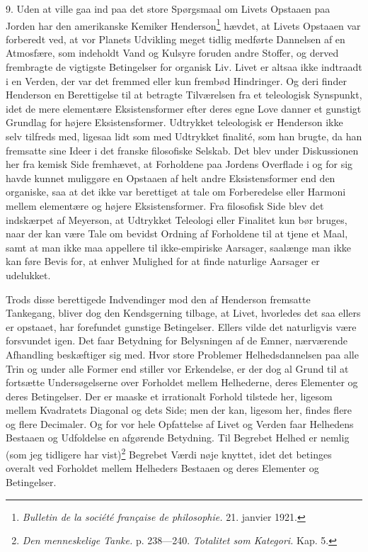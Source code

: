 \documentclass[12pt]{article}
\newcommand{\opage}[1]{\marginnote{\footnotesize\textit{[#1]}}}
\begin{document}
9. Uden at ville gaa ind paa det store Spørgsmaal om Livets Opstaaen
paa Jorden har den amerikanske Kemiker Henderson\footnote{\textit{Bulletin
de la société française de philosophie.} 21. janvier 1921.} hævdet, at
Livets Opstaaen var forberedt ved, at vor Planets Udvikling meget
tidlig medførte Dannelsen af en Atmosfære, som indeholdt Vand og
Kulsyre foruden andre Stoffer, og derved frembragte de vigtigste
\opage{31}Betingelser for organisk Liv. Livet er altsaa ikke indtraadt i
en Verden, der var det fremmed eller kun frembød Hindringer. Og deri
finder Henderson en Berettigelse til at betragte Tilværelsen fra et
teleologisk Synspunkt, idet de mere elementære Eksistensformer efter
deres egne Love danner et gunstigt Grundlag for højere
Eksistensformer. Udtrykket \guillemotright{}teleologisk\guillemotleft{} er Henderson ikke
selv tilfreds med, ligesaa lidt som med Udtrykket
\guillemotright{}finalité\guillemotleft{}, som han brugte, da han fremsatte sine Ideer i det
franske filosofiske Selskab. Det blev under Diskussionen her fra kemisk
Side fremhævet, at Forholdene paa Jordens Overflade i og for sig havde
kunnet muliggøre en Opstaaen af helt andre Eksistensformer end den
organiske, saa at det ikke var berettiget at tale om Forberedelse eller
Harmoni mellem elementære og højere Eksistensformer. Fra filosofisk
Side blev det indskærpet af Meyerson, at Udtrykket Teleologi eller
Finalitet kun bør bruges, naar der kan være Tale om bevidst Ordning af
Forholdene til at tjene et Maal, samt at man ikke maa appellere til
ikke-empiriske Aarsager, saalænge man ikke kan føre Bevis for, at
enhver Mulighed for at finde naturlige Aarsager er udelukket.

Trods disse berettigede Indvendinger mod den af Henderson fremsatte
Tankegang, bliver dog den Kendsgerning tilbage, at Livet, hvorledes det
saa ellers er opstaaet, har forefundet gunstige Betingelser. Ellers
vilde det naturligvis være forsvundet igen. Det faar Betydning for
Belysningen af de Emner, nærværende Afhandling beskæftiger sig med. Hvor
store Problemer Helhedsdannelsen paa alle Trin og under alle Former end
stiller vor Erkendelse, er der dog al Grund til at fortsætte
Undersøgelserne over Forholdet mellem Helhederne, deres Elementer og
deres
\setcounter{footnote}{0}%
\opage{32}Betingelser. Der er maaske et irrationalt Forhold tilstede her,
ligesom mellem Kvadratets Diagonal og dets Side; men der kan, ligesom
her, findes flere og flere Decimaler. Og for vor hele Opfattelse af
Livet og Verden faar Helhedens Bestaaen og Udfoldelse en afgørende
Betydning. Til Begrebet Helhed er nemlig (som jeg tidligere har
vist)\footnote{\textit{Den menneskelige Tanke.} p. 238---240.
\textit{Totalitet som Kategori.} Kap. 5.} Begrebet Værdi nøje knyttet,
idet det betinges overalt ved Forholdet mellem Helheders Bestaaen og
deres Elementer og Betingelser.
\end{document}
